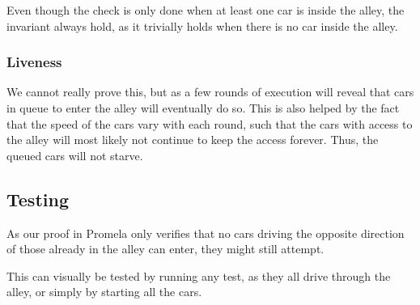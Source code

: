 Even though the check is only done when at least one car is inside the alley, the invariant always hold, as it trivially holds when there is no car inside the alley.


\subsubsection{Liveness}
We cannot really prove this, but as a few rounds of execution will reveal that cars in queue to enter the alley will eventually do so. This is also helped by the fact that the speed of the cars vary with each round, such that the cars with access to the alley will most likely not continue to keep the access forever. Thus, the queued cars will not starve.


\subsection{Testing}
\label{sub:all-test}
As our proof in Promela only verifies that no cars driving the
opposite direction of those already in the alley can enter, they might
still attempt.

This can visually be tested by running any test, as they all drive through
the alley, or simply by starting all the cars.
